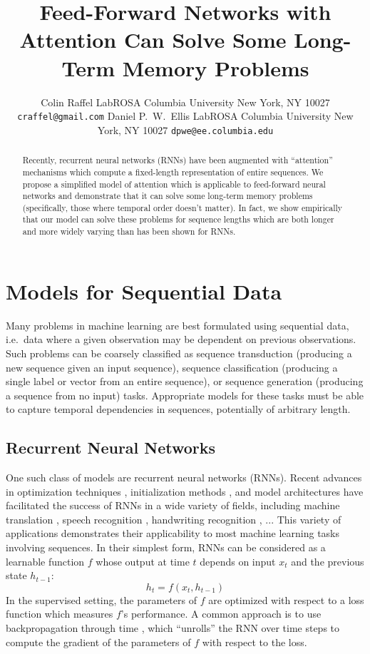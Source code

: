 \documentclass{article} %
\title{Feed-Forward Networks with Attention Can Solve Some Long-Term Memory Problems}
\author{
Colin Raffel
LabROSA
Columbia University
New York, NY 10027
\texttt{craffel@gmail.com}
\And
Daniel P.~W.~Ellis
LabROSA
Columbia University
New York, NY 10027
\texttt{dpwe@ee.columbia.edu}
}
\begin{document}
\maketitle

\begin{abstract}
Recently, recurrent neural networks (RNNs) have been augmented with ``attention'' mechanisms which compute a fixed-length representation of entire sequences.
We propose a simplified model of attention which is applicable to feed-forward neural networks and demonstrate that it can solve some long-term memory problems (specifically, those where temporal order doesn't matter).
In fact, we show empirically that our model can solve these problems for sequence lengths which are both longer and more widely varying than has been shown for RNNs.
\end{abstract}

\section{Models for Sequential Data}

Many problems in machine learning are best formulated using sequential data, i.e.\ data where a given observation may be dependent on previous observations.
Such problems can be coarsely classified as sequence transduction (producing a new sequence given an input sequence), sequence classification (producing a single label or vector from an entire sequence), or sequence generation (producing a sequence from no input) tasks.
Appropriate models for these tasks must be able to capture temporal dependencies in sequences, potentially of arbitrary length.

\subsection{Recurrent Neural Networks}

One such class of models are recurrent neural networks (RNNs).
Recent advances in optimization techniques \cite{}, initialization methods \cite{}, and model architectures \cite{} have facilitated the success of RNNs in a wide variety of fields, including machine translation \cite{}, speech recognition \cite{}, handwriting recognition \cite{}, ...
This variety of applications demonstrates their applicability to most machine learning tasks involving sequences.
In their simplest form, RNNs can be considered as a learnable function $f$ whose output at time $t$ depends on input $x_t$ and the previous state $h_{t - 1}$:
$$
h_t = f(x_t, h_{t - 1})
$$
In the supervised setting, the parameters of $f$ are optimized with respect to a loss function which measures $f$'s performance.
A common approach is to use backpropagation through time \cite{}, which ``unrolls'' the RNN over time steps to compute the gradient of the parameters of $f$ with respect to the loss.
\end{document}
